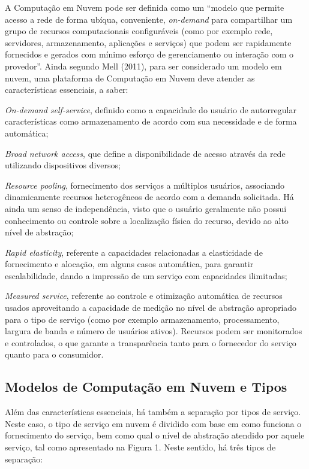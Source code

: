 A Computação em Nuvem pode ser definida como um “modelo que permite acesso a rede de forma ubíqua, conveniente, \textit{on-demand} para compartilhar um grupo de recursos computacionais configuráveis (como por exemplo rede, servidores, armazenamento, aplicações e serviços) que podem ser rapidamente fornecidos e gerados com mínimo esforço de gerenciamento ou interação com o provedor”\cite{mell2011nist}. Ainda segundo Mell (2011), para ser considerado um modelo em nuvem, uma plataforma de Computação em Nuvem deve atender as características essenciais, a saber: 
\begin{alineas}
	\item \textit{On-demand self-service}, definido como a capacidade do usuário de autorregular características como armazenamento de acordo com sua necessidade e de forma automática;
	\item \textit{Broad network access}, que define a disponibilidade de acesso através da rede utilizando dispositivos diversos; 
	\item \textit{Resource pooling}, fornecimento dos serviços a múltiplos usuários, associando dinamicamente recursos heterogêneos de acordo com a demanda solicitada. Há ainda um senso de independência, visto que o usuário geralmente não possui conhecimento ou controle sobre a localização física do recurso, devido ao alto nível de abstração; 
	\item \textit{Rapid elasticity}, referente a capacidades relacionadas a elasticidade de fornecimento e alocação, em alguns casos automática, para garantir escalabilidade, dando a impressão de um serviço com capacidades ilimitadas; 
	\item \textit{Measured service}, referente ao controle e otimização automática de recursos usados aproveitando a capacidade de medição no nível de abstração apropriado para o tipo de serviço (como por exemplo armazenamento, processamento, largura de banda e número de usuários ativos). Recursos podem ser monitorados e controlados, o que garante a transparência tanto para o fornecedor do serviço quanto para o consumidor. 		
\end{alineas}

\subsection{Modelos de Computação em Nuvem e Tipos}\label{sec:mod}

Além das características essenciais, há também a separação por tipos de serviço. Neste caso, o tipo de serviço em nuvem é dividido com base em como funciona o fornecimento do serviço, bem como qual o nível de abstração atendido por aquele serviço, tal como apresentado na Figura 1. Neste sentido, há três tipos de separação: 

